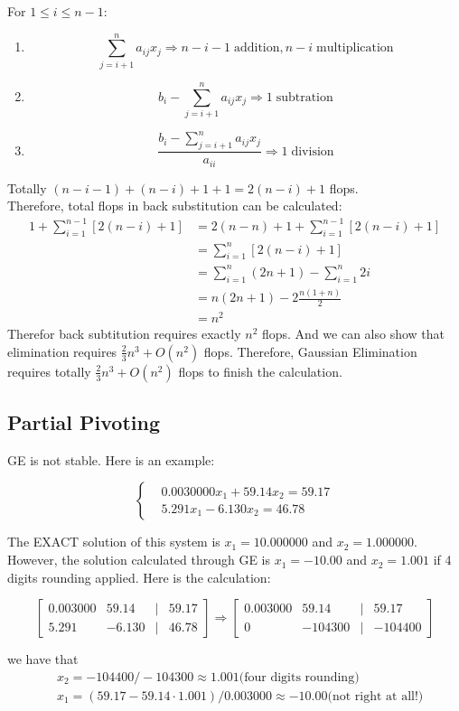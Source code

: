 	For $1\leq i \leq n-1$:
	\begin{enumerate}
	\item \[\sum_{j=i+1}^n a_{ij}x_j \Rightarrow n-i-1\;\text{addition},n-i\;\text{multiplication} \]
	
	\item \[  b_i-\sum_{j=i+1}^n a_{ij}x_j  \Rightarrow 1\;\text{subtration}\]
	
	\item \[ \frac{b_i-\sum_{j=i+1}^n a_{ij}x_j}{a_{ii}} \Rightarrow 1\;\text{division}\]
	\end{enumerate}
	Totally $(n-i-1)+(n-i)+1+1=2(n-i)+1$ flops.\\
	Therefore, total flops in back substitution can be calculated:
	\begin{align*}
	1 + \sum_{i=1}^{n-1} [2(n-i)+1] &= 2(n-n) +1 + \sum_{i=1}^{n-1} [2(n-i)+1] \\
	&=\sum_{i=1}^n [2(n-i)+1]\\
	&= \sum_{i=1}^n (2n+1) - \sum_{i=1}^n 2i\\ 
	&= n(2n+1) -2\frac{n(1+n)}{2} \\
	&= n^2
	\end{align*}
	Therefor back subtitution requires exactly $n^2$ flops. And we can also show that elimination requires $\frac{2}{3}n^3 + O(n^2)$ flops. Therefore, Gaussian Elimination requires totally $\frac{2}{3}n^3 + O(n^2)$ flops to finish the calculation.
	
	\subsection*{Partial Pivoting}
	GE is not stable. Here is an example:
	\begin{ex}
	\[ \begin{cases}
		&0.0030000x_1 + 59.14x_2 = 59.17\\
		&5.291x_1 - 6.130x_2 = 46.78
	\end{cases} \]

	The EXACT solution of this system is $x_1 = 10.000000$ and $x_2 = 1.000000$. However, the solution calculated through GE is $x_1 = -10.00$ and $x_2 = 1.001$ if 4 digits rounding applied. Here is the calculation:
	
	\[
	\begin{bmatrix}
	0.003000 & 59.14 &| &59.17\\
	5.291    & -6.130 &| &46.78
	\end{bmatrix}  
	\Rightarrow
	\begin{bmatrix}
	0.003000 & 59.14 &| &59.17\\
	     0   & -104300 &| & -104400
	\end{bmatrix}  
	\]
	
	we have that
	\begin{align*}
	&x_2 = -104400/ -104300 \approx 1.001  \text{(four digits rounding)}\\
	&x_1 = (59.17-59.14\cdot1.001)/0.003000 \approx -10.00  \text{(not right at all!)}
	\end{align*}
	\end{ex}
	
